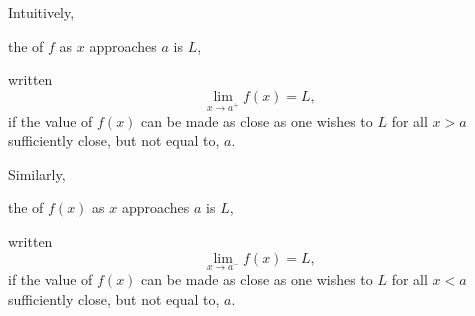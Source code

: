 \documentclass[handout]{ximera}
\begin{document}
\begin{definition}
  Intuitively,
  \begin{center}
    the  of $f$ as $x$ approaches $a$ is
    $L$,
  \end{center}
  written
  \[
  \lim_{x\to a^+} f(x) = L,
  \]
  if the value of $f(x)$ can be made as close as one wishes to $L$ for
  all $x>a$ sufficiently close, but not equal to, $a$.
  
  Similarly,
  \begin{center}
    the  of $f(x)$ as $x$ approaches $a$ is
    $L$,
  \end{center}
  written
  \[
  \lim_{x\to a^-} f(x) = L,
  \]
  if the value of $f(x)$ can be made as close as one wishes to $L$ for
  all $x<a$ sufficiently close, but not equal to, $a$.
\end{definition}

\newpage
\end{document}
